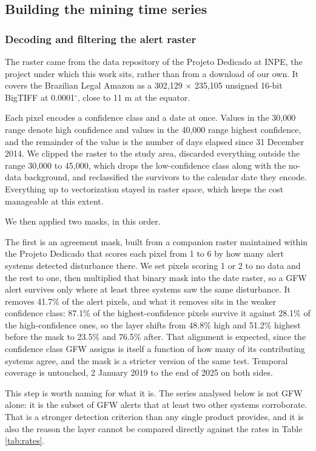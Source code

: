 \documentclass[11pt]{article}
\begin{document}
\subsection{Building the mining time series}

\subsubsection{Decoding and filtering the alert raster}
\label{sec:decode}

The raster came from the data repository of the Projeto Dedicado at INPE, the project under which this work sits, rather than from a download of our own. It covers the Brazilian Legal Amazon as a 302{,}129 $\times$ 235{,}105 unsigned 16-bit BigTIFF at 0.0001$^\circ$, close to 11 m at the equator.

Each pixel encodes a confidence class and a date at once. Values in the 30{,}000 range denote high confidence and values in the 40{,}000 range highest confidence, and the remainder of the value is the number of days elapsed since 31 December 2014. We clipped the raster to the study area, discarded everything outside the range 30{,}000 to 45{,}000, which drops the low-confidence class along with the no-data background, and reclassified the survivors to the calendar date they encode. Everything up to vectorization stayed in raster space, which keeps the cost manageable at this extent.

We then applied two masks, in this order.

The first is an agreement mask, built from a companion raster maintained within the Projeto Dedicado that scores each pixel from 1 to 6 by how many alert systems detected disturbance there. We set pixels scoring 1 or 2 to no data and the rest to one, then multiplied that binary mask into the date raster, so a GFW alert survives only where at least three systems saw the same disturbance. It removes 41.7\% of the alert pixels, and what it removes sits in the weaker confidence class: 87.1\% of the highest-confidence pixels survive it against 28.1\% of the high-confidence ones, so the layer shifts from 48.8\% high and 51.2\% highest before the mask to 23.5\% and 76.5\% after. That alignment is expected, since the confidence class GFW assigns is itself a function of how many of its contributing systems agree, and the mask is a stricter version of the same test. Temporal coverage is untouched, 2 January 2019 to the end of 2025 on both sides.

This step is worth naming for what it is. The series analysed below is not GFW alone: it is the subset of GFW alerts that at least two other systems corroborate. That is a stronger detection criterion than any single product provides, and it is also the reason the layer cannot be compared directly against the rates in Table \ref{tab:rates}.
\end{document}
